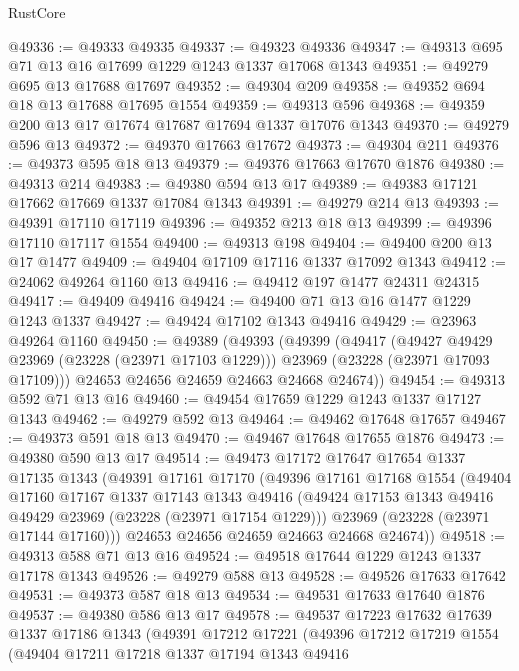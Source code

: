 \begin{lexlean}{RustCore}
\begin{coremodule}
@49336 := @49333 @49335
@49337 := @49323 @49336
@49347 := @49313 @695 @71 @13 @16 @17699 @1229 @1243 @1337 @17068 @1343
@49351 := @49279 @695 @13 @17688 @17697
@49352 := @49304 @209
@49358 := @49352 @694 @18 @13 @17688 @17695 @1554
@49359 := @49313 @596
@49368 := @49359 @200 @13 @17 @17674 @17687 @17694 @1337 @17076 @1343
@49370 := @49279 @596 @13
@49372 := @49370 @17663 @17672
@49373 := @49304 @211
@49376 := @49373 @595 @18 @13
@49379 := @49376 @17663 @17670 @1876
@49380 := @49313 @214
@49383 := @49380 @594 @13 @17
@49389 := @49383 @17121 @17662 @17669 @1337 @17084 @1343
@49391 := @49279 @214 @13
@49393 := @49391 @17110 @17119
@49396 := @49352 @213 @18 @13
@49399 := @49396 @17110 @17117 @1554
@49400 := @49313 @198
@49404 := @49400 @200 @13 @17 @1477
@49409 := @49404 @17109 @17116 @1337 @17092 @1343
@49412 := @24062 @49264 @1160 @13
@49416 := @49412 @197 @1477 @24311 @24315
@49417 := @49409 @49416
@49424 := @49400 @71 @13 @16 @1477 @1229 @1243 @1337
@49427 := @49424 @17102 @1343 @49416
@49429 := @23963 @49264 @1160
@49450 := @49389
    (@49393
      (@49399
        (@49417
          (@49427 @49429 @23969 (@23228 (@23971 @17103 @1229)))
          @23969
          (@23228 (@23971 @17093 @17109)))
        @24653
        @24656
        @24659
        @24663
        @24668
        @24674))
@49454 := @49313 @592 @71 @13 @16
@49460 := @49454 @17659 @1229 @1243 @1337 @17127 @1343
@49462 := @49279 @592 @13
@49464 := @49462 @17648 @17657
@49467 := @49373 @591 @18 @13
@49470 := @49467 @17648 @17655 @1876
@49473 := @49380 @590 @13 @17
@49514 := @49473
    @17172
    @17647
    @17654
    @1337
    @17135
    @1343
    (@49391
      @17161
      @17170
      (@49396
        @17161
        @17168
        @1554
        (@49404
          @17160
          @17167
          @1337
          @17143
          @1343
          @49416
          (@49424 @17153 @1343 @49416 @49429 @23969 (@23228 (@23971 @17154 @1229)))
          @23969
          (@23228 (@23971 @17144 @17160)))
        @24653
        @24656
        @24659
        @24663
        @24668
        @24674))
@49518 := @49313 @588 @71 @13 @16
@49524 := @49518 @17644 @1229 @1243 @1337 @17178 @1343
@49526 := @49279 @588 @13
@49528 := @49526 @17633 @17642
@49531 := @49373 @587 @18 @13
@49534 := @49531 @17633 @17640 @1876
@49537 := @49380 @586 @13 @17
@49578 := @49537
    @17223
    @17632
    @17639
    @1337
    @17186
    @1343
    (@49391
      @17212
      @17221
      (@49396
        @17212
        @17219
        @1554
        (@49404
          @17211
          @17218
          @1337
          @17194
          @1343
          @49416

\end{coremodule}
\end{lexlean}
